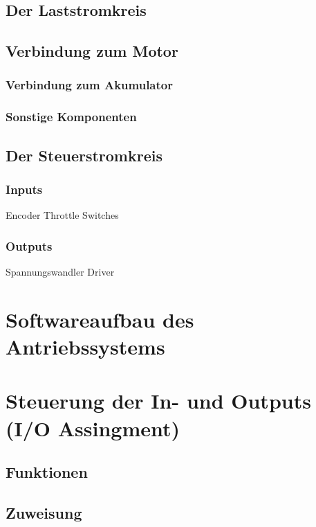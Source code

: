 \subsection{Der Laststromkreis}
\subsection{Verbindung zum Motor}
\subsubsection{Verbindung zum Akumulator}
\subsubsection{Sonstige Komponenten}

\subsection{Der Steuerstromkreis}
\subsubsection{Inputs}
Encoder
Throttle
Switches
\subsubsection{Outputs}
Spannungswandler
Driver



\section{Softwareaufbau des Antriebssystems}

\section{ Steuerung der In- und Outputs (I/O Assingment)}
\subsection{Funktionen}
\subsection{Zuweisung}


